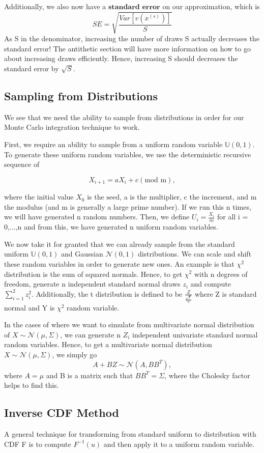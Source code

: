 \documentclass[twoside]{article}
\begin{document}
Additionally, we also now have a $\textbf{standard error}$ on our approximation, which is 
$$
SE = \sqrt{\frac{Var[v(x^{(s)})]}{S}}
$$
As S in the denominator, increasing the number of draws S actually decreases the standard error! The antithetic section will have more information on how to go about increasing draws efficiently. Hence, increasing S should decreases the standard error by $\sqrt{S}$. 


\subsection{Sampling from Distributions}
We see that we need the ability to sample from distributions in order for our Monte Carlo integration technique to work. 

First, we require an ability to sample from a uniform random variable $\mathbb{U}(0,1)$. To generate these uniform random variables, we use the deterministic recursive sequence of

$$
X_{i+1} = aX_i + c(\text{mod m}),
$$

where the initial value $X_0$ is the $\text{seed}$, a is the multiplier, c the increment, and m the modulus (and m is generally a large prime number). If we run this n times, we will have generated n random numbers. Then, we define $U_i = \frac{X_i}{m}$ for all i = 0,...,n and from this, we have generated n uniform random variables.

We now take it for granted that we can already sample from the standard uniform $\mathbb{U}(0,1)$ and Gaussian $\mathcal{N}(0,1)$ distributions. We can scale and shift these random variables in order to generate new ones. An example is that $\chi^2$ distribution is the sum of squared normals. Hence, to get $\chi^2$ with n degrees of freedom, generate n independent standard normal draws $z_i$ and compute $\sum_{i=1}^2z_i^2$. Additionally, the t distribution is defined to be $\frac{Z}{\frac{\sqrt{Y}}{n}}$ where Z is standard normal and Y is $\chi^2$ random variable.

In the cases of where we want to simulate from multivariate normal distribution of $X \sim \mathcal{N}(\mu, \Sigma)$, we can generate n $Z_i$ independent univariate standard normal random variables. Hence, to get a multivariate normal distribution $X \sim \mathcal{N}(\mu, \Sigma)$, we simply go 
$$
A + BZ \sim \mathcal{N}(A, BB^T),
$$
where $A = \mu$ and B is a matrix such that $BB^T = \Sigma$, where the Cholesky factor helps to find this. 

\subsection{Inverse CDF Method}
A general technique for transforming from standard uniform to distribution with CDF F is to compute $F^{-1}(u)$ and then apply it to a uniform random variable.
\end{document}
